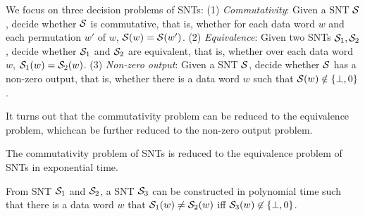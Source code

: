 


%
%
%




We focus on three decision problems of SNTs: (1) \emph{Commutativity}: Given a SNT ${\mathcal{S} }$, decide whether ${\mathcal{S} }$ is commutative, that is, whether for each data word $w$ and each permutation $w'$ of $w$, ${\mathcal{S} }(w)={\mathcal{S} }(w')$. (2) \emph{Equivalence}: Given two SNTs ${\mathcal{S} }_1,{\mathcal{S} }_2$, decide whether ${\mathcal{S} }_1$ and ${\mathcal{S} }_2$ are equivalent, that is, whether over each data word $w$, ${\mathcal{S} }_1(w)={\mathcal{S} }_2(w)$. (3) \emph{Non-zero output}: Given a SNT ${\mathcal{S} }$, decide whether ${\mathcal{S} }$ has a non-zero output, that is, whether there is a data word $w$ such that ${\mathcal{S} }(w)\notin \{\bot, 0\}$. 

It turns out that the commutativity problem can be reduced to the equivalence problem, whichcan be further reduced to the non-zero output problem.

\begin{proposition}\label{prop-snt-cmm-to-eqv}
The commutativity problem of SNTs is reduced to the equivalence problem of SNTs in exponential time. 
\end{proposition}
\begin{proposition}\label{prop-snt-eqv-to-nzero}
From SNT ${\mathcal{S} }_1$ and ${\mathcal{S} }_2$, a SNT ${\mathcal{S} }_3$ can be constructed in polynomial time such that there is a data word $w$ that ${\mathcal{S} }_1(w) \neq {\mathcal{S} }_2(w)$ iff ${\mathcal{S} }_3(w) \not\in \{\bot,0\}$. 
\end{proposition}


